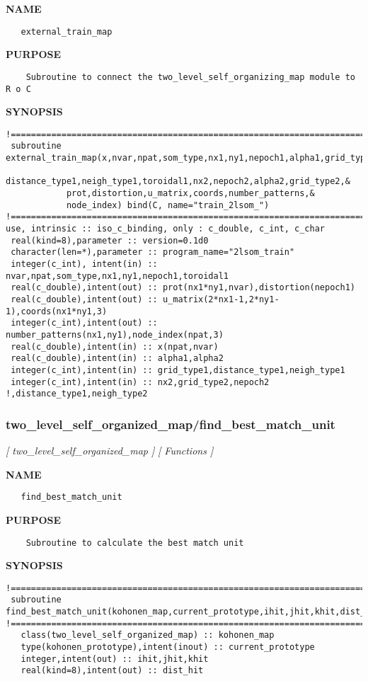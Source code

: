 \documentclass{article}
\begin{document}
\label{ch:robo59}
\label{ch:two_level_self_organized_map_external_train_map}
\textbf{NAME}
\begin{verbatim}
   external_train_map
\end{verbatim}
\textbf{PURPOSE}
\begin{verbatim}
    Subroutine to connect the two_level_self_organizing_map module to R o C
\end{verbatim}
\textbf{SYNOPSIS}
\begin{verbatim}
!========================================================================================
 subroutine external_train_map(x,nvar,npat,som_type,nx1,ny1,nepoch1,alpha1,grid_type1,&
            distance_type1,neigh_type1,toroidal1,nx2,nepoch2,alpha2,grid_type2,&
            prot,distortion,u_matrix,coords,number_patterns,&
            node_index) bind(C, name="train_2lsom_")
!========================================================================================
use, intrinsic :: iso_c_binding, only : c_double, c_int, c_char
 real(kind=8),parameter :: version=0.1d0
 character(len=*),parameter :: program_name="2lsom_train"
 integer(c_int), intent(in) :: nvar,npat,som_type,nx1,ny1,nepoch1,toroidal1
 real(c_double),intent(out) :: prot(nx1*ny1,nvar),distortion(nepoch1)
 real(c_double),intent(out) :: u_matrix(2*nx1-1,2*ny1-1),coords(nx1*ny1,3)
 integer(c_int),intent(out) :: number_patterns(nx1,ny1),node_index(npat,3)
 real(c_double),intent(in) :: x(npat,nvar)
 real(c_double),intent(in) :: alpha1,alpha2
 integer(c_int),intent(in) :: grid_type1,distance_type1,neigh_type1
 integer(c_int),intent(in) :: nx2,grid_type2,nepoch2 !,distance_type1,neigh_type2
\end{verbatim}
\newpage
\subsubsection{two\_level\_self\_organized\_map/find\_best\_match\_unit}
\textsl{[ two\_level\_self\_organized\_map ]}
\textsl{[ Functions ]}

\label{ch:robo60}
\label{ch:two_level_self_organized_map_find_best_match_unit}
\textbf{NAME}
\begin{verbatim}
   find_best_match_unit
\end{verbatim}
\textbf{PURPOSE}
\begin{verbatim}
    Subroutine to calculate the best match unit  
\end{verbatim}
\textbf{SYNOPSIS}
\begin{verbatim}
!========================================================================================
 subroutine find_best_match_unit(kohonen_map,current_prototype,ihit,jhit,khit,dist_hit)
!========================================================================================
   class(two_level_self_organized_map) :: kohonen_map
   type(kohonen_prototype),intent(inout) :: current_prototype
   integer,intent(out) :: ihit,jhit,khit
   real(kind=8),intent(out) :: dist_hit
\end{verbatim}
\newpage
\end{document}
